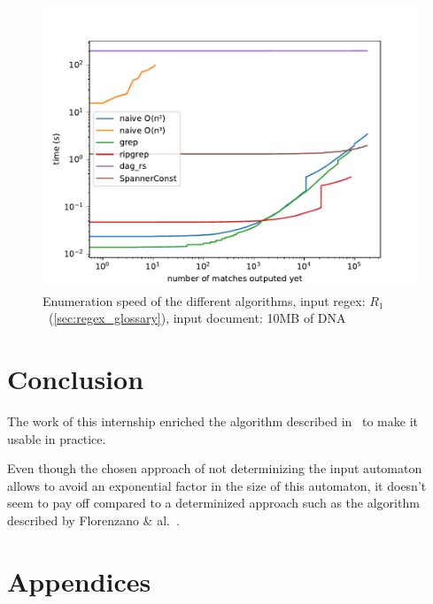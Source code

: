 \documentclass[12px]{article}
\theoremstyle{definition}
\begin{document}
      \begin{figure}%
        \label{fig:bench}
        \caption{
          Enumeration speed of the different algorithms, input regex:
          $R_1$~(\ref{sec:regex_glossary}), input document: 10MB of DNA
        }
        \center\includegraphics[width=5in]{figures/bench}
      \end{figure}



  \section{Conclusion}

    The work of this internship enriched the algorithm described
    in~\cite{ICDT19} to make it usable in practice.

    Even though the chosen approach of not determinizing the input automaton
    allows to avoid an exponential factor in the size of this automaton, it
    doesn't seem to pay off compared to a determinized approach such as the
    algorithm described by Florenzano \& al.~\cite{florenzano2018constant}.

  \pagebreak
  
  


  \pagebreak
  \section*{Appendices}
\end{document}

